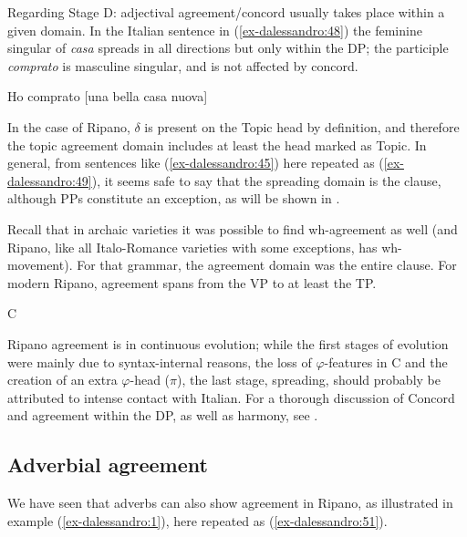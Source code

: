 \documentclass[output=paper
,modfonts
,nonflat]{langsci/langscibook}
\begin{document}
\noindent Regarding Stage D: adjectival agreement/concord usually takes place within a given domain. In the Italian sentence in (\ref{ex-dalessandro:48}) the feminine singular of \textit{casa} spreads in all directions but only within the DP; the participle \textit{comprato} is masculine singular, and is not affected by concord. 

\begin{exe}
\ex\label{ex-dalessandro:48} Ho comprato [una bella casa nuova]
\end{exe}
In the case of Ripano, $\delta $ is present on the Topic head by definition, and therefore the topic agreement domain includes at least the head marked as Topic. In general, from sentences like (\ref{ex-dalessandro:45}) here repeated as (\ref{ex-dalessandro:49}), it seems safe to say that the spreading domain is the clause, although PPs constitute an exception, as will be shown in .

Recall that in archaic varieties it was possible to find wh-agreement as well (and Ripano, like all Italo-Romance varieties with some exceptions, has wh-move\-ment). For that grammar, the agreement domain was the entire clause. For modern Ripano, agreement spans from the VP to at least the TP. 

\begin{exe}
\ex C   
\end{exe}
Ripano agreement is in continuous evolution; while the first stages of evolution were mainly due to syntax-internal reasons, the loss of $\varphi $-features in C and the creation of an extra $\varphi $-head ($\pi $), the last stage, spreading, should probably be attributed to intense contact with Italian. For a thorough discussion of Concord and agreement within the DP, as well as harmony, see \citet{Paciaroni2017}. 

\subsection{Adverbial agreement} \label{sec-dalessandro:5.4}
We have seen that adverbs can also show agreement in Ripano, as illustrated in example (\ref{ex-dalessandro:1}), here repeated as (\ref{ex-dalessandro:51}).
\end{document}

